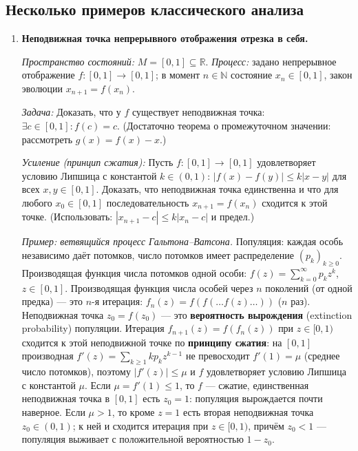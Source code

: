 \documentclass[11pt, a4paper]{extarticle}
\newcommand{\R}{{\mathbb R}}
\newcommand{\N}{{\mathbb N}}
\renewcommand{\le}{\leqslant}
\renewcommand{\ge}{\geqslant}
\begin{document}
\subsection{Несколько примеров классического анализа}

\begin{enumerate}[leftmargin=*, label=\textbf{Пример \arabic*.}]

\item \textbf{Неподвижная точка непрерывного отображения отрезка в себя.}

\textit{Пространство состояний:} $M = [0,1] \subseteq \R$. \textit{Процесс:} задано непрерывное отображение $f: [0,1] \to [0,1]$; в момент $n \in \N$ состояние $x_n \in [0,1]$, закон эволюции $x_{n+1} = f(x_n)$.

\textit{Задача:} Доказать, что у $f$ существует неподвижная точка: $\exists c \in [0,1]: f(c) = c$. (Достаточно теорема о промежуточном значении: рассмотреть $g(x) = f(x) - x$.)

\textit{Усиление (принцип сжатия):} Пусть $f: [0,1] \to [0,1]$ удовлетворяет условию Липшица с константой $k \in (0,1)$: $|f(x) - f(y)| \le k|x-y|$ для всех $x,y \in [0,1]$. Доказать, что неподвижная точка единственна и что для любого $x_0 \in [0,1]$ последовательность $x_{n+1} = f(x_n)$ сходится к этой точке. (Использовать: $|x_{n+1} - c| \le k|x_n - c|$ и предел.)

\textit{Пример: ветвящийся процесс Гальтона--Ватсона.} Популяция: каждая особь независимо даёт потомков, число потомков имеет распределение $(p_k)_{k\ge 0}$. Производящая функция числа потомков одной особи: $f(z) = \sum_{k=0}^\infty p_k z^k$, $z \in [0,1]$. Производящая функция числа особей через $n$ поколений (от одной предка) --- это $n$-я итерация: $f_n(z) = f(f(\ldots f(z)\ldots))$ ($n$ раз). Неподвижная точка $z_0 = f(z_0)$ --- это \textbf{вероятность вырождения} (extinction probability) популяции. Итерация $f_{n+1}(z) = f(f_n(z))$ при $z \in [0,1)$ сходится к этой неподвижной точке по \textbf{принципу сжатия}: на $[0,1]$ производная $f'(z) = \sum_{k\ge 1} k p_k z^{k-1}$ не превосходит $f'(1) = \mu$ (среднее число потомков), поэтому $|f'(z)| \le \mu$ и $f$ удовлетворяет условию Липшица с константой $\mu$. Если $\mu = f'(1) \le 1$, то $f$ --- сжатие, единственная неподвижная точка в $[0,1]$ есть $z_0 = 1$: популяция вырождается почти наверное. Если $\mu > 1$, то кроме $z=1$ есть вторая неподвижная точка $z_0 \in (0,1)$; к ней и сходится итерация при $z \in [0,1)$, причём $z_0 < 1$ --- популяция выживает с положительной вероятностью $1 - z_0$.


\end{enumerate}
\end{document}
